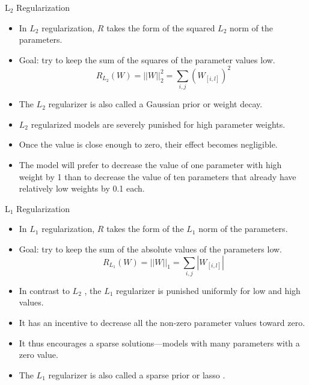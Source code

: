 \documentclass[handout]{beamer}
\begin{document}
\begin{frame}{L$_2$ Regularization}
\begin{scriptsize}
\begin{itemize}
\item  In $L_2$ regularization, $R$ takes the form of the squared $L_2$ norm of the parameters.
\item Goal: try to keep the sum of the squares of the parameter values low.
  \begin{displaymath}
   R_{L_{2}}(W) = ||W||^{2}_{2} = \sum_{i,j}(W_{[i,l]})^2
  \end{displaymath}
\item The $L_2$ regularizer is also called a Gaussian prior or weight decay.
\item $L_2$ regularized models are severely punished for high parameter weights.
\item Once the value is close enough to zero, their effect becomes negligible.
\item The model will prefer to decrease the value of one parameter with high weight by 1 than to decrease the value of ten parameters that already have relatively low weights by 0.1 each.
\end{itemize}
\end{scriptsize}

\end{frame}



\begin{frame}{L$_1$ Regularization}
\begin{scriptsize}
\begin{itemize}
  \item  In $L_1$ regularization, $R$ takes the form of the $L_1$ norm of the parameters.
  \item Goal: try to keep the sum of the absolute values of the parameters low.
  \begin{displaymath}
   R_{L_{1}}(W) = ||W||_{1} = \sum_{i,j} |W_{[i,l]}|
  \end{displaymath}
 \item In contrast to $L_2$ , the $L_1$ regularizer is punished uniformly for low and high values.
 \item It has an incentive to decrease all the non-zero parameter values toward zero. 
 \item It thus encourages a sparse solutions—models with many parameters with a zero value. 
 \item The $L_1$ regularizer is also called a sparse prior or lasso \cite{tibshirani1996regression}. 
  \end{itemize}
\end{scriptsize}

\end{frame}
\end{document}

